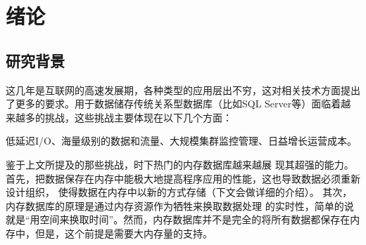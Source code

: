 \documentclass{zjutthesis}
\begin{document}



\frontmatter



\tableofcontents           %
\listoffigures             %
\listoftables              %


\mainmatter


\chapter{绪论}
\section{研究背景}
这几年是互联网的高速发展期，各种类型的应用层出不穷，这对相关技术方面提出了更多的要求。用于数据储存传统关系型数据库（比如SQL Server等）面临着越来越多的挑战，这些挑战主要体现在以下几个方面：

低延迟I/O、海量级别的数据和流量、大规模集群监控管理、日益增长运营成本。

鉴于上文所提及的那些挑战，时下热门的内存数据库越来越展
现其超强的能力。首先，把数据保存在内存中能极大地提高程序应用的性能，这也导致数据必须重新设计组织，
使得数据在内存中以新的方式存储（下文会做详细的介绍）。
其次，内存数据库的原理是通过内存资源作为牺牲来换取数据处理
的实时性，简单的说就是“用空间来换取时间”。然而，内存数据库并不是完全的将所有数据都保存在内存中，但是，这个前提是需要大内存量的支持。
\end{document}
